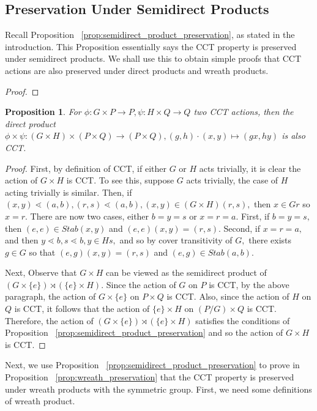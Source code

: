 \documentclass[10 pt]{amsart}
\theoremstyle{plain}
\newtheorem{prop}[thm]{Proposition}
\theoremstyle{definition}
\theoremstyle{remark}
\numberwithin{equation}{section}
\newcommand\ssec{\subsection}
\begin{document}
\ssec{Preservation Under Semidirect Products}
\label{ssec:semidirect_product_preservation}
Recall Proposition ~\ref{prop:semidirect_product_preservation}, as stated in the introduction. This Proposition essentially says the CCT property is preserved under semidirect products. We shall use this to obtain simple proofs that CCT actions are also preserved under direct products and wreath products.

\semidirect*

\begin{proof}

\end{proof}

\begin{prop}
\label{prop:direct_product_preservation}
For $\phi:G\times P\rightarrow P,\psi:H \times Q \rightarrow Q$ two CCT actions, then the direct product $\phi \times \psi:(G\times H)\times (P\times Q) \rightarrow (P\times Q),(g,h)\cdot (x,y) \mapsto (gx,hy)$ is also CCT.
\end{prop}
\begin{proof}
First, by definition of CCT, if either $G$ or $H$ acts trivially, it is clear the action of $G\times H$ is CCT. To see this, suppose $G$ acts trivially, the case of $H$ acting trivially is similar. Then, if $(x,y) \lessdot (a,b),(r,s)\lessdot (a,b),(x,y) \in (G\times H)(r,s),$ then $x \in Gr$ so $x = r.$ There are now two cases, either $b = y = s$ or $x = r = a.$ First, if $b = y = s,$ then $(e,e) \in Stab(x,y)$ and $(e,e)(x,y) = (r,s).$ Second, if $x = r = a,$ and then $y \lessdot b,s \lessdot b,y \in Hs,$ and so by cover transitivity of $G,$ there exists $g \in G$ so that $(e,g)(x,y) = (r,s)$ and $(e,g) \in Stab(a,b).$

Next, Observe that $G \times H$ can be viewed as the semidirect product of $(G\times \{e\}) \rtimes (\{e\} \times H).$ Since the action of $G$ on $P$ is CCT, by the above paragraph, the action of $G\times \{e\}$ on $P \times Q$ is CCT. Also, since the action of $H$ on $Q$ is CCT, it follows that the action of $\{e\}\times H$ on $(P/G) \times Q$ is CCT. Therefore, the action of $(G\times \{e\}) \rtimes (\{e\} \times H)$ satisfies the conditions of Proposition ~\ref{prop:semidirect_product_preservation} and so the action of $G\times H$ is CCT.
\end{proof}

Next, we use Proposition ~\ref{prop:semidirect_product_preservation} to prove in Proposition ~\ref{prop:wreath_preservation} that the CCT property is preserved under wreath products with the symmetric group. First, we need some definitions of wreath product.
\end{document}
